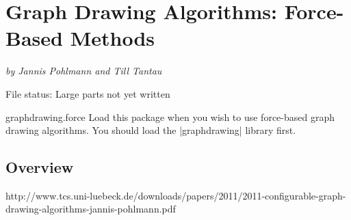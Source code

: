 %
%
%

\section{Graph Drawing Algorithms: Force-Based Methods}
\label{section-library-graphdrawing-force-based}
\label{section-last-graphdrawing-library-in-manual}

{\emph{by Jannis Pohlmann and Till Tantau}}


File status: Large parts not yet written

\begin{tikzlibrary}{graphdrawing.force}
  Load this package when you wish to use force-based graph drawing
  algorithms. You should load the |graphdrawing| library first.
\end{tikzlibrary}

\subsection{Overview}


http://www.tcs.uni-luebeck.de/downloads/papers/2011/2011-configurable-graph-drawing-algorithms-jannis-pohlmann.pdf






